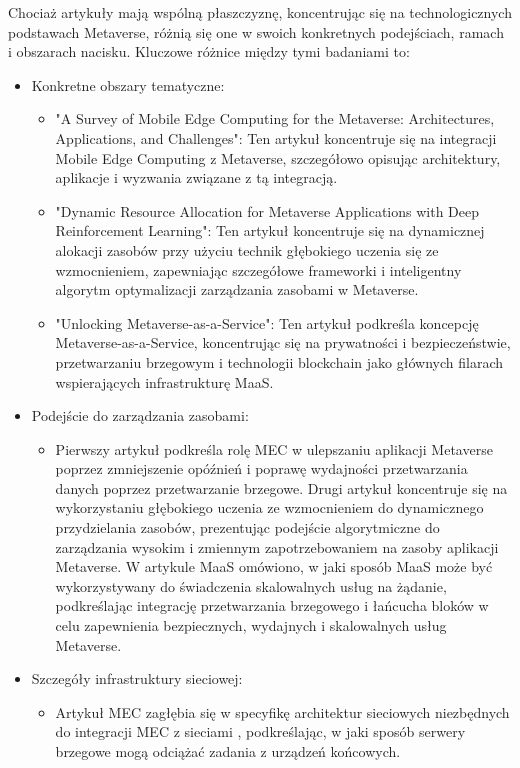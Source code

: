 Chociaż artykuły mają wspólną płaszczyznę, koncentrując się na technologicznych podstawach Metaverse, różnią się one w swoich konkretnych podejściach, ramach i obszarach nacisku. Kluczowe różnice między tymi badaniami to:
\begin{itemize}
    \item Konkretne obszary tematyczne:
    \begin{itemize}
        \item "A Survey of Mobile Edge Computing for the Metaverse: Architectures, Applications, and Challenges": Ten artykuł koncentruje się na integracji Mobile Edge Computing z Metaverse, szczegółowo opisując architektury, aplikacje i wyzwania związane z tą integracją.
        \item "Dynamic Resource Allocation for Metaverse Applications with Deep Reinforcement Learning": Ten artykuł koncentruje się na dynamicznej alokacji zasobów przy użyciu technik głębokiego uczenia się ze wzmocnieniem, zapewniając szczegółowe frameworki i inteligentny algorytm optymalizacji zarządzania zasobami w Metaverse.
        \item "Unlocking Metaverse-as-a-Service": Ten artykuł podkreśla koncepcję Metaverse-as-a-Service, koncentrując się na prywatności i bezpieczeństwie, przetwarzaniu brzegowym i technologii blockchain jako głównych filarach wspierających infrastrukturę MaaS.
    \end{itemize}
    \item Podejście do zarządzania zasobami:
    \begin{itemize}
        \item  Pierwszy artykuł podkreśla rolę MEC w ulepszaniu aplikacji Metaverse poprzez zmniejszenie opóźnień i poprawę wydajności przetwarzania danych poprzez przetwarzanie brzegowe.
        Drugi artykuł koncentruje się na wykorzystaniu głębokiego uczenia ze wzmocnieniem do dynamicznego przydzielania zasobów, prezentując podejście algorytmiczne do zarządzania wysokim i zmiennym zapotrzebowaniem na zasoby aplikacji Metaverse.
        W artykule MaaS omówiono, w jaki sposób MaaS może być wykorzystywany do świadczenia skalowalnych usług na żądanie, podkreślając integrację przetwarzania brzegowego i łańcucha bloków w celu zapewnienia bezpiecznych, wydajnych i skalowalnych usług Metaverse.
    \end{itemize}
    \item Szczegóły infrastruktury sieciowej:
    \begin{itemize}
        \item Artykuł MEC zagłębia się w specyfikę architektur sieciowych niezbędnych do integracji MEC z sieciami , podkreślając, w jaki sposób serwery brzegowe mogą odciążać zadania z urządzeń końcowych.

\end{itemize}
\end{itemize}
